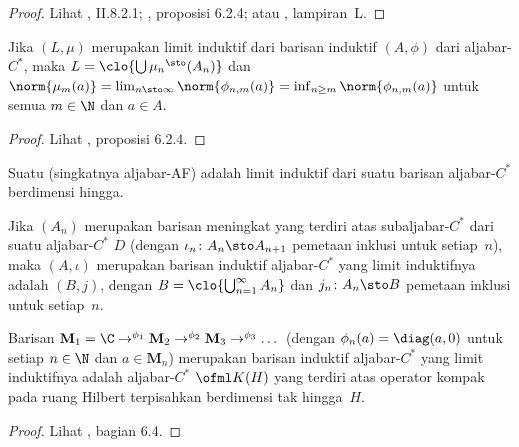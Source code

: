 \begin{proof} Lihat \cite{Blackadar:2006}, II.8.2.1; \cite{RordamLL:2000}, proposisi 6.2.4; atau
\cite{Wegge-Olsen:1993}, lampiran~L.  \ns
\end{proof}

\begin{prop} Jika $(L,\mu)$ merupakan limit induktif dari barisan induktif $(A,\phi)$ dari
aljabar-$C^*$, maka $L = \clo{\bigcup {\mu_n}^\sto(A_n)}$ dan $\norm{\mu_m(a)} = \lim_{n \sto
\infty}\norm{\phi_{n,m}(a)} = \inf_{n \ge m}\norm{\phi_{n,m}(a)}$ untuk semua $m \in \N$ dan $a
\in A$.
\end{prop}

\begin{proof} Lihat \cite{RordamLL:2000}, proposisi 6.2.4.   \ns \end{proof}

\begin{defn} Suatu
 (singkatnya aljabar-AF) adalah limit induktif
dari suatu barisan aljabar-$C^*$ berdimensi hingga.
\end{defn}

\begin{exam} Jika $(A_n)$ merupakan barisan meningkat yang terdiri atas subaljabar-$C^*$ dari suatu aljabar-$C^*$ $D$
(dengan $\iota_n\colon A_n \sto A_{n+1}$ pemetaan inklusi untuk setiap~$n$), maka $(A,\iota)$
merupakan barisan induktif aljabar-$C^*$ yang limit induktifnya adalah $(B,j)$, dengan $B =
\clo{\bigcup_{n=1}^\infty A_n}$ dan $j_n\colon A_n \sto B$ pemetaan inklusi untuk setiap~$n$. %
\end{exam}

\begin{exam} Barisan $\mathbf M_1 = \C \to^{\phi_1} \mathbf M_2 \to^{\phi_2} \mathbf M_3
\to^{\phi_3} \dots$ (dengan $\phi_n(a) = \diag(a,0)$ untuk setiap $n \in \N$ dan $a \in \mathbf
M_n$) merupakan barisan induktif aljabar-$C^*$ yang limit induktifnya adalah aljabar-$C^*$
$\ofml K(H)$ yang terdiri atas operator kompak pada ruang Hilbert terpisahkan berdimensi tak hingga~$H$. %
\end{exam}

\begin{proof} Lihat \cite{RordamLL:2000}, bagian 6.4.  \ns \end{proof}

